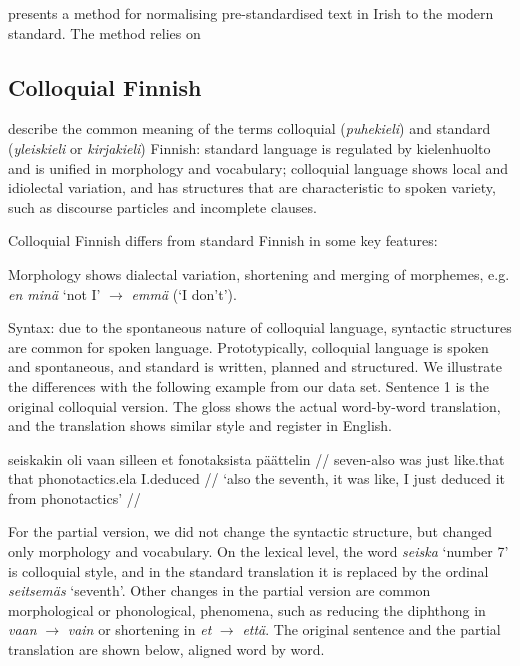 \documentclass[11pt]{article}
\begin{document}
 presents a method for normalising pre-standardised text in Irish to 
the modern standard. The method relies on 

\subsection{Colloquial Finnish}


 describe the common meaning of the terms colloquial (\emph{puhekieli}) and standard (\emph{yleiskieli} or \emph{kirjakieli}) Finnish: standard language is regulated by kielenhuolto and is unified in morphology and vocabulary; colloquial language shows local and idiolectal variation, and has structures that are characteristic to spoken variety,  such as discourse particles and incomplete clauses.



Colloquial Finnish differs from standard Finnish in some key features: 

Morphology shows dialectal variation, shortening and merging of morphemes, e.g. \emph{en min\"{a}} `not I' $\rightarrow$ \emph{emm\"{a}} (`I don't').

Syntax: due to the spontaneous nature of colloquial language, syntactic structures are common for spoken language. 
Prototypically, colloquial language is spoken and spontaneous, and standard is written, planned and structured. We illustrate the differences with the following example from our data set. Sentence 1 is the original colloquial version. The gloss shows the actual word-by-word translation, and the translation shows similar style and register in English.

\ex
\begingl
\gla seiskakin oli vaan silleen et fonotaksista p\"{a}\"{a}ttelin //
\glb seven-{\sc also} was just like.that that phonotactics.{\sc ela} I.deduced //
\glft `also the seventh, it was like, I just deduced it from phonotactics' //
\endgl
\xe


For the partial version, we did not change the syntactic structure, but changed only morphology and vocabulary. On the lexical level, the word \emph{seiska} `number 7' is colloquial style, and in the standard translation it is replaced by the ordinal \emph{seitsem\"{a}s} `seventh'.  Other changes in the partial version are common morphological or phonological, phenomena, such as reducing the diphthong in \emph{vaan} $\rightarrow$ \emph{vain} or shortening in  \emph{et} $\rightarrow$ \emph{että}. The original sentence and the partial translation are shown below, aligned word by word.
\end{document}
